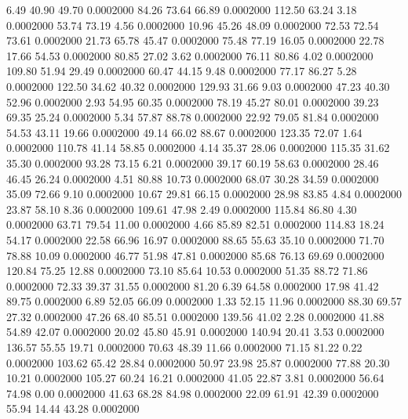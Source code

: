    6.49   40.90   49.70   0.0002000
  84.26   73.64   66.89   0.0002000
 112.50   63.24    3.18   0.0002000
  53.74   73.19    4.56   0.0002000
  10.96   45.26   48.09   0.0002000
  72.53   72.54   73.61   0.0002000
  21.73   65.78   45.47   0.0002000
  75.48   77.19   16.05   0.0002000
  22.78   17.66   54.53   0.0002000
  80.85   27.02    3.62   0.0002000
  76.11   80.86    4.02   0.0002000
 109.80   51.94   29.49   0.0002000
  60.47   44.15    9.48   0.0002000
  77.17   86.27    5.28   0.0002000
 122.50   34.62   40.32   0.0002000
 129.93   31.66    9.03   0.0002000
  47.23   40.30   52.96   0.0002000
   2.93   54.95   60.35   0.0002000
  78.19   45.27   80.01   0.0002000
  39.23   69.35   25.24   0.0002000
   5.34   57.87   88.78   0.0002000
  22.92   79.05   81.84   0.0002000
  54.53   43.11   19.66   0.0002000
  49.14   66.02   88.67   0.0002000
 123.35   72.07    1.64   0.0002000
 110.78   41.14   58.85   0.0002000
   4.14   35.37   28.06   0.0002000
 115.35   31.62   35.30   0.0002000
  93.28   73.15    6.21   0.0002000
  39.17   60.19   58.63   0.0002000
  28.46   46.45   26.24   0.0002000
   4.51   80.88   10.73   0.0002000
  68.07   30.28   34.59   0.0002000
  35.09   72.66    9.10   0.0002000
  10.67   29.81   66.15   0.0002000
  28.98   83.85    4.84   0.0002000
  23.87   58.10    8.36   0.0002000
 109.61   47.98    2.49   0.0002000
 115.84   86.80    4.30   0.0002000
  63.71   79.54   11.00   0.0002000
   4.66   85.89   82.51   0.0002000
 114.83   18.24   54.17   0.0002000
  22.58   66.96   16.97   0.0002000
  88.65   55.63   35.10   0.0002000
  71.70   78.88   10.09   0.0002000
  46.77   51.98   47.81   0.0002000
  85.68   76.13   69.69   0.0002000
 120.84   75.25   12.88   0.0002000
  73.10   85.64   10.53   0.0002000
  51.35   88.72   71.86   0.0002000
  72.33   39.37   31.55   0.0002000
  81.20    6.39   64.58   0.0002000
  17.98   41.42   89.75   0.0002000
   6.89   52.05   66.09   0.0002000
   1.33   52.15   11.96   0.0002000
  88.30   69.57   27.32   0.0002000
  47.26   68.40   85.51   0.0002000
 139.56   41.02    2.28   0.0002000
  41.88   54.89   42.07   0.0002000
  20.02   45.80   45.91   0.0002000
 140.94   20.41    3.53   0.0002000
 136.57   55.55   19.71   0.0002000
  70.63   48.39   11.66   0.0002000
  71.15   81.22    0.22   0.0002000
 103.62   65.42   28.84   0.0002000
  50.97   23.98   25.87   0.0002000
  77.88   20.30   10.21   0.0002000
 105.27   60.24   16.21   0.0002000
  41.05   22.87    3.81   0.0002000
  56.64   74.98    0.00   0.0002000
  41.63   68.28   84.98   0.0002000
  22.09   61.91   42.39   0.0002000
  55.94   14.44   43.28   0.0002000
